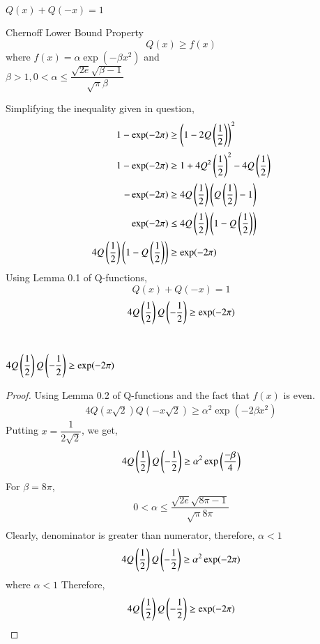 \begin{lemma}
    $Q(x)+Q(-x)=1$
\end{lemma}
\begin{lemma}
Chernoff Lower Bound Property
    $$Q(x)\geq f(x)$$
    where $f(x) = \alpha \exp(-\beta x^2)$ and \\[3pt]$\beta > 1, 0 < \alpha \leq \dfrac{\sqrt{2e}\sqrt{\beta-1}}{\sqrt{\pi}\beta} $
\end{lemma}
Simplifying the inequality given in question,
\begin{align}
    1-\exp(-2 \pi)  &\geq \left(1-2Q\left(\dfrac{1}{2}\right)\right)^2 \\[1.5pt]
    1-\exp(-2 \pi) &\geq 1+4Q^2\left(\dfrac{1}{2}\right)^2-4Q\left(\dfrac{1}{2}\right)\\[1.5pt]
    -\exp(-2 \pi) &\geq 4Q\left(\dfrac{1}{2}\right)\left(Q\left(\dfrac{1}{2}\right)-1\right) \\[1.5pt]
    \exp(-2 \pi) &\leq 4Q\left(\dfrac{1}{2}\right)\left(1-Q\left(\dfrac{1}{2}\right)\right) \\[1.5pt]
    4Q\left(\dfrac{1}{2}\right)\left(1-Q\left(\dfrac{1}{2}\right)\right)&\geq \exp(-2 \pi)
\end{align}
Using Lemma 0.1 of Q-functions,
\begin{equation}
    Q(x)+Q(-x)=1
\end{equation}
\begin{align}
    4Q\left(\dfrac{1}{2}\right)Q\left(-\dfrac{1}{2}\right)\geq \exp(-2 \pi)
\end{align}
\\
\begin{lemma}
$4Q\left(\dfrac{1}{2}\right)Q\left(-\dfrac{1}{2}\right)\geq \exp(-2 \pi)$
\end{lemma}
\begin{proof}
Using Lemma 0.2 of Q-functions and the fact that $f(x)$ is even.
\begin{align}
    4Q(x\sqrt{2})Q(-x\sqrt{2}) \geq \alpha^{2}\exp(-2\beta x^{2})
\end{align}
Putting $x=\dfrac{1}{2 \sqrt{2}}$, we get,\\
\begin{align}
    4Q\left(\dfrac{1}{2}\right)Q\left(-\dfrac{1}{2}\right)\geq \alpha^{2}\exp\left(\dfrac{-\beta}{4}\right)
\end{align}
For $\beta = 8\pi$, 
\begin{align}
    0 < \alpha \leq \dfrac{\sqrt{2e}\sqrt{8 \pi-1}}{\sqrt{\pi} 8\pi}\\
\end{align} 
 Clearly, denominator is greater than numerator, therefore, $\alpha < 1$
\begin{align}
    4Q\left(\dfrac{1}{2}\right)Q\left(-\dfrac{1}{2}\right)\geq \alpha^{2}\exp(-2\pi)
\end{align}
where $\alpha < 1$
Therefore,
\begin{align}
    4Q\left(\dfrac{1}{2}\right)Q\left(-\dfrac{1}{2}\right)\geq \exp(-2\pi)
\end{align}
\end{proof}